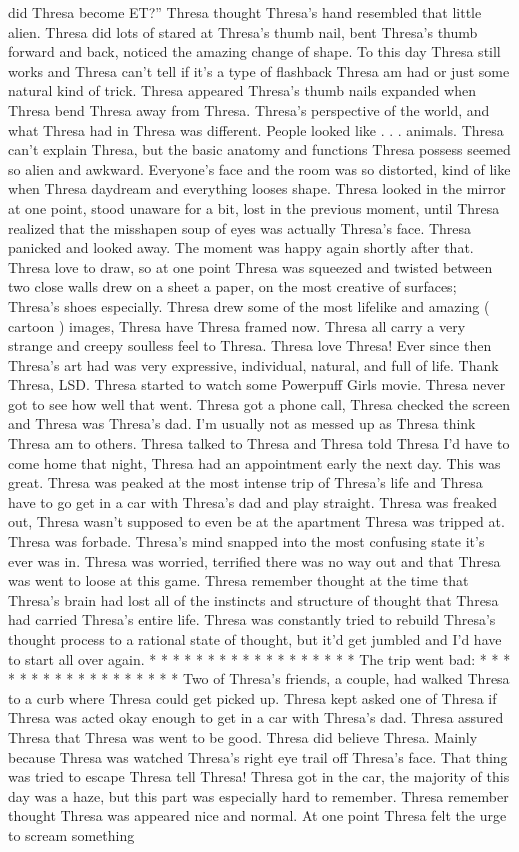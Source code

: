 \documentclass[12pt]{book}
\begin{document}
did Thresa become ET?'' Thresa thought Thresa's hand resembled that little alien. Thresa did lots of stared at Thresa's thumb nail, bent Thresa's thumb forward and back, noticed the amazing change of shape. To this day Thresa still works and Thresa can't tell if it's a type of flashback Thresa am had or just some natural kind of trick. Thresa appeared Thresa's thumb nails expanded when Thresa bend Thresa away from Thresa. Thresa's perspective of the world, and what Thresa had in Thresa was different. People looked like . . .  animals. Thresa can't explain Thresa, but the basic anatomy and functions Thresa possess seemed so alien and awkward. Everyone's face and the room was so distorted, kind of like when Thresa daydream and everything looses shape. Thresa looked in the mirror at one point, stood unaware for a bit, lost in the previous moment, until Thresa realized that the misshapen soup of eyes was actually Thresa's face. Thresa panicked and looked away. The moment was happy again shortly after that. Thresa love to draw, so at one point Thresa was squeezed and twisted between two close walls drew on a sheet a paper, on the most creative of surfaces; Thresa's shoes especially. Thresa drew some of the most lifelike and amazing ( cartoon ) images, Thresa have Thresa framed now. Thresa all carry a very strange and creepy soulless feel to Thresa. Thresa love Thresa! Ever since then Thresa's art had was very expressive, individual, natural, and full of life. Thank Thresa, LSD. Thresa started to watch some Powerpuff Girls movie. Thresa never got to see how well that went. Thresa got a phone call, Thresa checked the screen and Thresa was Thresa's dad. I'm usually not as messed up as Thresa think Thresa am to others. Thresa talked to Thresa and Thresa told Thresa I'd have to come home that night, Thresa had an appointment early the next day. This was great. Thresa was peaked at the most intense trip of Thresa's life and Thresa have to go get in a car with Thresa's dad and play straight. Thresa was freaked out, Thresa wasn't supposed to even be at the apartment Thresa was tripped at. Thresa was forbade. Thresa's mind snapped into the most confusing state it's ever was in. Thresa was worried, terrified there was no way out and that Thresa was went to loose at this game. Thresa remember thought at the time that Thresa's brain had lost all of the instincts and structure of thought that Thresa had carried Thresa's entire life. Thresa was constantly tried to rebuild Thresa's thought process to a rational state of thought, but it'd get jumbled and I'd have to start all over again. * * * * * * * * * * * * * * * * * * The trip went bad: * * * * * * * * * * * * * * * * * * Two of Thresa's friends, a couple, had walked Thresa to a curb where Thresa could get picked up. Thresa kept asked one of Thresa if Thresa was acted okay enough to get in a car with Thresa's dad. Thresa assured Thresa that Thresa was went to be good. Thresa did believe Thresa. Mainly because Thresa was watched Thresa's right eye trail off Thresa's face. That thing was tried to escape Thresa tell Thresa! Thresa got in the car, the majority of this day was a haze, but this part was especially hard to remember. Thresa remember thought Thresa was appeared nice and normal. At one point Thresa felt the urge to scream something 
\end{document}
